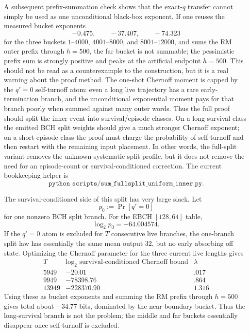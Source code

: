 A subsequent prefix-summation check shows that the exact-\(q\) transfer cannot simply be used as one unconditional
black-box exponent.  If one reuses the measured bucket exponents
\[
-0.475,\qquad -37.407,\qquad -74.323
\]
for the three buckets \(1\text{--}4000\), \(4001\text{--}8000\), and \(8001\text{--}12000\), and sums the RM outer
prefix through \(h=500\), the far bucket is not summable; the pessimistic prefix sum is strongly positive and peaks at
the artificial endpoint \(h=500\).  This should not be read as a counterexample to the construction, but it is a real
warning about the proof method.  The one-shot Chernoff moment is capped by the \(q'=0\) self-turnoff atom: even a long
live trajectory has a rare early-termination branch, and the unconditional exponential moment pays for that branch
poorly when summed against many outer words.  Thus the full proof should split the inner event into survival/episode
classes.  On a long-survival class the emitted BCH split weights should give a much stronger Chernoff exponent; on a
short-episode class the proof must charge the probability of self-turnoff and then restart with the remaining input
placement.  In other words, the full-split variant removes the unknown systematic split profile, but it does not remove
the need for an episode-count or survival-conditioned correction.  The current bookkeeping helper is
\[
\texttt{python scripts/sum\_fullsplit\_uniform\_inner.py}.
\]

The survival-conditioned side of this split has very large slack.  Let
\[
p_0:=\Pr[q'=0]
\]
for one nonzero BCH split branch.  For the EBCH \([128,64]\) table,
\[
\log_2 p_0=-64.004574.
\]
If the \(q'=0\) atom is excluded for \(T\) consecutive live branches, the one-branch split law has essentially the same
mean output \(32\), but no early absorbing off state.  Optimizing the Chernoff parameter for the three current live
lengths gives
\[
\begin{array}{c|c|c}
T & \log_2\text{ survival-conditioned Chernoff bound} & \lambda\\
\hline
5949 & -20.01 & .017\\
9949 & -78398.76 & .864\\
13949 & -228370.90 & 1.316
\end{array}
\]
Using these as bucket exponents and summing the RM prefix through \(h=500\) gives total about \(-34.77\) bits, dominated
by the near-boundary bucket.  Thus the long-survival branch is not the problem; the middle and far buckets essentially
disappear once self-turnoff is excluded.


